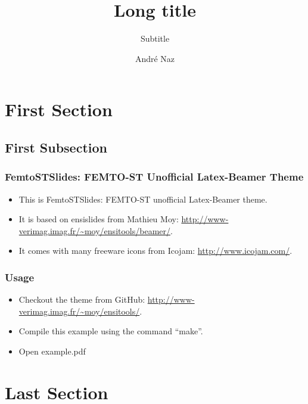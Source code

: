 \documentclass{beamer}
\title[Short title]{Long title}
\subtitle{Subtitle} %
\author{André Naz}
\institute{Femto-st}
\begin{document}
\begin{frame}
  \titlepage
\end{frame}

\section{First Section}

\subsection{First Subsection}

\begin{frame} \frametitle{FemtoSTSlides: FEMTO-ST Unofficial Latex-Beamer Theme}
  
  \begin{itemize}
  \item This is FemtoSTSlides: FEMTO-ST unofficial Latex-Beamer theme.
  \item It is based on ensislides from Mathieu Moy: \url{http://www-verimag.imag.fr/~moy/ensitools/beamer/}.
  \item It comes with many freeware icons from Icojam: \url{http://www.icojam.com/}. 
  \pause
  \end{itemize}

\end{frame}

\begin{frame} \frametitle{Usage}
  
  \begin{itemize}
  \item Checkout the theme from GitHub: \url{http://www-verimag.imag.fr/~moy/ensitools/}.
  \item Compile this example using the command ``make''.
  \item Open example.pdf
  \end{itemize}
\end{frame}

\section{Last Section}
\end{document}
